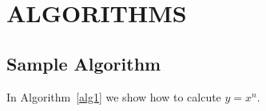 \chapter{ALGORITHMS}\label{ch:algorithms}

\section{Sample Algorithm}
In Algorithm~\ref{alg1} we show how to calcute $y=x^n$.

\begin{algorithm}
  \caption{Calculate $y = x^n$}
  \label{alg1}
  \begin{algorithmic}
    
  \end{algorithmic}
\end{algorithm}

\endinput
